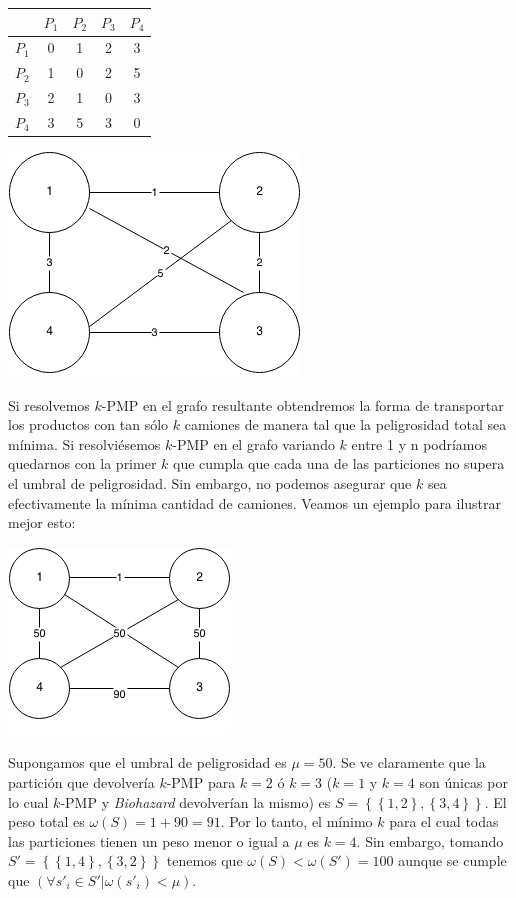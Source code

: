 \begin{center}
  \begin{tabular}{ c | c | c | c | c}
          & $P_1$ & $P_2$ & $P_3$ & $P_4$ \tabularnewline \hline
    $P_1$ & 0 & 1 & 2 & 3 \tabularnewline \hline
    $P_2$ & 1 & 0 & 2 & 5 \tabularnewline \hline
    $P_3$ & 2 & 1 & 0 & 3 \tabularnewline \hline
    $P_4$ & 3 & 5 & 3 & 0 \tabularnewline
  \end{tabular}
  \includegraphics[scale=0.4]{ejemplo_modelado_camiones}
\end{center}

Si resolvemos $k$-PMP en el grafo resultante obtendremos la forma de transportar los productos con tan sólo $k$ camiones
de manera tal que la peligrosidad total sea mínima. Si resolviésemos $k$-PMP en el grafo variando $k$ entre 1 y n
podríamos quedarnos con la primer $k$ que cumpla que cada una de las particiones no supera el umbral de peligrosidad. Sin embargo, no
podemos asegurar que $k$ sea efectivamente la mínima cantidad de camiones. Veamos un ejemplo para ilustrar mejor esto:

\begin{center}
  \includegraphics[scale=0.5]{camiones}
\end{center}

Supongamos que el umbral de peligrosidad es $\mu = 50$. Se ve claramente que la partición que devolvería $k$-PMP para $k = 2$ ó $k = 3$ ($k = 1$ y $k = 4$
son únicas por lo cual $k$-PMP y \emph{Biohazard} devolverían la mismo) es $S = \left\{ \left\{1, 2\right\}, \left\{3, 4\right\}\right\}$.
El peso total es $\omega (S) = 1 + 90 = 91$. Por lo tanto, el mínimo $k$ para el cual todas las particiones tienen un peso menor o igual a $\mu$ es
$k = 4$. Sin embargo, tomando $S' = \left\{ \left\{1, 4\right\}, \left\{3, 2\right\}\right\}$ tenemos que $\omega (S) < \omega (S') = 100$
aunque se cumple que $(\forall s'_i \in S' \vert \omega(s'_i) < \mu)$.

